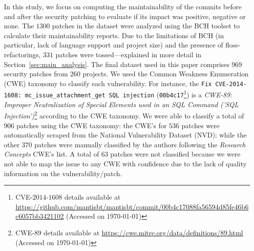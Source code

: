 \documentclass[smallextended]{svjour3}       %
\begin{document}
In this study, we focus on computing the maintainability of the 
commits before and after the security patching to evaluate if its 
impact was positive, negative or none. The $1300$ patches in the 
dataset were analyzed using the BCH toolset to calculate their 
maintainability reports. Due to the limitations of BCH (in particular, 
lack of language support and project size) and the presence of
floss-refactorings, $331$ patches were tossed---explained in 
more detail in Section~\ref{sec:main_analysis}.
The final dataset used in this 
paper comprises $969$ security patches from $260$ projects. We used the 
Common Weakness Enumeration (CWE) taxonomy to classify each vulnerability. 
For instance,  the \texttt{Fix CVE-2014-1608: mc\_issue\_attachment\_get SQL injection} 
(\texttt{00b4c17}\footnote{CVE-$2014$-$1608$ details available at 
\url{https://github.com/mantisbt/mantisbt/commit/00b4c17088fa56594d85fe46b6c6057bb3421102} 
(Accessed on \today)}) is a \emph{CWE-89: Improper Neutralization of Special Elements used 
in an SQL Command ('SQL Injection')}\footnote{CWE-$89$ details available at \url{https://cwe.mitre.org/data/definitions/89.html} 
(Accessed on \today)} according to the CWE taxonomy.
We were able to classify a total of $906$ patches using the CWE taxonomy:
the CWE's for $536$ patches were automatically scraped from the National 
Vulnerability Dataset (NVD); while the other $370$ patches were manually classified by 
the authors following the \emph{Research Concepts} CWE's list. A total 
of $63$ patches were not classified because we were not able to map
the issue to any CWE with confidence due to the lack of quality
information on the vulnerability/patch.

\end{document}
